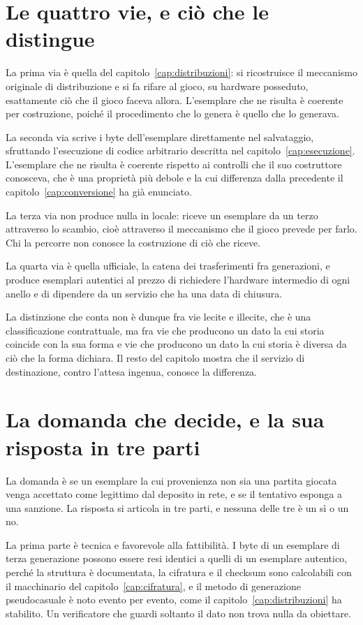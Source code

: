 \section{Le quattro vie, e ciò che le distingue}

La prima via è quella del capitolo~\ref{cap:distribuzioni}: si ricostruisce il meccanismo originale di distribuzione e si fa rifare al gioco, su hardware posseduto, esattamente ciò che il gioco faceva allora. L'esemplare che ne risulta è coerente per costruzione, poiché il procedimento che lo genera è quello che lo generava.

La seconda via scrive i byte dell'esemplare direttamente nel salvataggio, sfruttando l'esecuzione di codice arbitrario descritta nel capitolo~\ref{cap:esecuzione}. L'esemplare che ne risulta è coerente rispetto ai controlli che il suo costruttore conosceva, che è una proprietà più debole e la cui differenza dalla precedente il capitolo~\ref{cap:conversione} ha già enunciato.

La terza via non produce nulla in locale: riceve un esemplare da un terzo attraverso lo scambio, cioè attraverso il meccanismo che il gioco prevede per farlo. Chi la percorre non conosce la costruzione di ciò che riceve.

La quarta via è quella ufficiale, la catena dei trasferimenti fra generazioni, e produce esemplari autentici al prezzo di richiedere l'hardware intermedio di ogni anello e di dipendere da un servizio che ha una data di chiusura.

La distinzione che conta non è dunque fra vie lecite e illecite, che è una classificazione contrattuale, ma fra vie che producono un dato la cui storia coincide con la sua forma e vie che producono un dato la cui storia è diversa da ciò che la forma dichiara. Il resto del capitolo mostra che il servizio di destinazione, contro l'attesa ingenua, conosce la differenza.

\section{La domanda che decide, e la sua risposta in tre parti}

La domanda è se un esemplare la cui provenienza non sia una partita giocata venga accettato come legittimo dal deposito in rete, e se il tentativo esponga a una sanzione. La risposta si articola in tre parti, e nessuna delle tre è un sì o un no.

La prima parte è tecnica e favorevole alla fattibilità. I byte di un esemplare di terza generazione possono essere resi identici a quelli di un esemplare autentico, perché la struttura è documentata, la cifratura e il checksum sono calcolabili con il macchinario del capitolo~\ref{cap:cifratura}, e il metodo di generazione pseudocasuale è noto evento per evento, come il capitolo~\ref{cap:distribuzioni} ha stabilito. Un verificatore che guardi soltanto il dato non trova nulla da obiettare.

